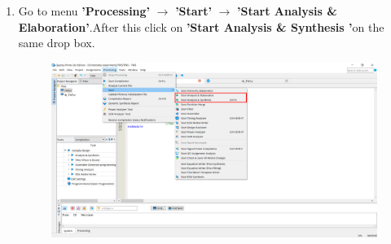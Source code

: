 \documentclass[12pt]{article}
\begin{document}
    \begin{enumerate}
        
        \item  Go to menu \textbf{'Processing'} $\rightarrow$ \textbf{'Start'} $\rightarrow$ \textbf{'Start Analysis \& Elaboration'}.After this click on \textbf{'Start Analysis \& Synthesis '}on the same drop box. 
            \begin{figure}[H]
                \centering
                \includegraphics[width=14cm,keepaspectratio]{tws8.png}
            \end{figure}
    

\end{enumerate}
\end{document}
